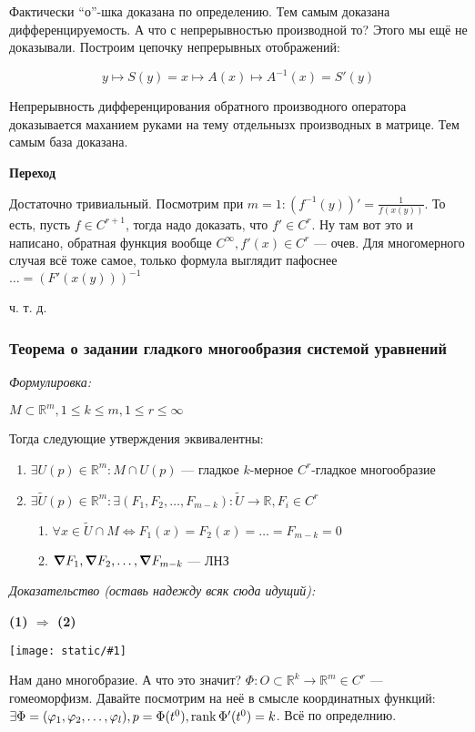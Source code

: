 \documentclass{article}
\def\image#1{\texttt{[image: static/\#1]}}
\begin{document}
Фактически ``о''-шка доказана по определению. Тем самым доказана дифференцируемость. А что с непрерывностью производной то? Этого мы ещё не доказывали. Построим цепочку непрерывных отображений:

\[y \mapsto S(y) = x \mapsto A(x) \mapsto A^{-1}(x) = S'(y)\]

Непрерывность дифференцирования обратного производного оператора доказывается маханием руками на тему отдельнызх производных в матрице. Тем самым база доказана.

\textbf{Переход}

Достаточно тривиальный. Посмотрим при $m = 1: (f^{-1}(y))' = \frac{1}{f(x(y))}$. То есть, пусть $f \in C^{r + 1}$, тогда надо доказать, что $f' \in C^r$. Ну там вот это и написано, обратная функция вообще $C^\infty, f'(x) \in C^r$ --- очев. Для многомерного случая всё тоже самое, только формула выглядит пафоснее $\ldots = (F'(x(y)))^{-1}$

ч. т. д.

\subsubsection{Теорема о задании гладкого многообразия системой уравнений}
\textit{Формулировка:}

$M \subset \mathbb{R}^m, 1 \le k \le m, 1 \le r \le \infty$

Тогда следующие утверждения эквивалентны:

\begin{enumerate}
    \item $\exists U(p) \in \mathbb{R}^m: M \cap U(p)$ --- гладкое $k$-мерное $C^r$-гладкое многообразие
    \item $\exists \widetilde{U}(p) \in \mathbb{R}^m: \exists (F_1, F_2, \ldots, F_{m - k}): \widetilde{U} \rightarrow \mathbb{R}, F_i \in C^r$ \begin{enumerate}
        \item $\forall x \in \widetilde{U} \cap M \Leftrightarrow F_1(x) = F_2(x) = \ldots = F_{m - k} = 0$
        \item $\grad F_1, \grad F_2, \ldots, \grad F_{m - k}$ --- ЛНЗ
    \end{enumerate}
\end{enumerate}
\textit{Доказательство (оставь надежду всяк сюда идущий):}

\textbf{(1) $\Rightarrow$ (2)}

\image{glad_mnogoobr.png}

Нам дано многобразие. А что это значит? $\Phi: O \subset \mathbb{R}^k \rightarrow \mathbb{R}^m \in C^r$ --- гомеоморфизм. Давайте посмотрим на неё в смысле координатных функций: $\exists \Phi = (\varphi_1, \varphi_2, \ldots, \varphi_l), p = \Phi(t^0), \rank \Phi'(t^0) = k$. Всё по определнию. 
\end{document}
